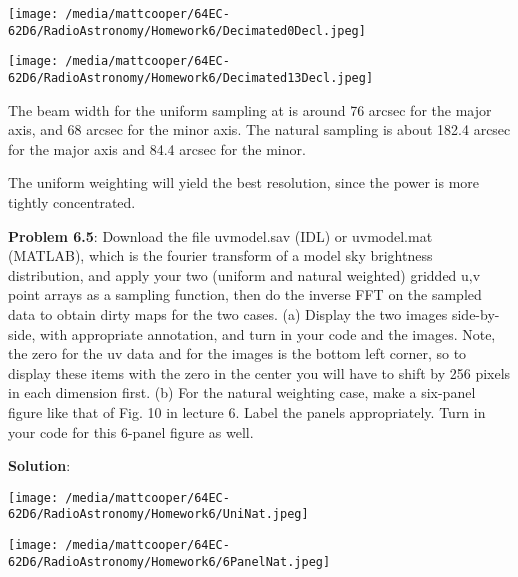 \documentclass{article}
\begin{document}
\smallskip
\texttt{[image: /media/mattcooper/64EC-62D6/RadioAstronomy/Homework6/Decimated0Decl.jpeg]}

\smallskip
\texttt{[image: /media/mattcooper/64EC-62D6/RadioAstronomy/Homework6/Decimated13Decl.jpeg]}

The beam width for the uniform sampling at is around 76 arcsec for the major axis, and 68 arcsec for the minor axis. The natural sampling is about 182.4 arcsec for the major axis and 84.4 arcsec for the minor.

The uniform weighting will yield the best resolution, since the power is more tightly concentrated.

\textbf{Problem 6.5}:  Download the file uvmodel.sav (IDL) or uvmodel.mat (MATLAB), which is the fourier transform of a model sky brightness distribution, and apply your two (uniform and natural weighted) gridded u,v point arrays as a sampling function, then do the inverse FFT on the sampled data to obtain dirty maps for the two cases. (a) Display the two images side-by-side, with appropriate annotation, and turn in your code and the images. Note, the zero for the uv data and for the images is the bottom left corner, so to display these items with the zero in the center you will have to shift by 256 pixels in each dimension first. (b) For the natural weighting case, make a six-panel figure like that of Fig. 10 in lecture 6. Label the panels appropriately. Turn in your code for this 6-panel figure as well.

\bigskip
\textbf{Solution}:

\texttt{[image: /media/mattcooper/64EC-62D6/RadioAstronomy/Homework6/UniNat.jpeg]}

\texttt{[image: /media/mattcooper/64EC-62D6/RadioAstronomy/Homework6/6PanelNat.jpeg]}
\end{document}
